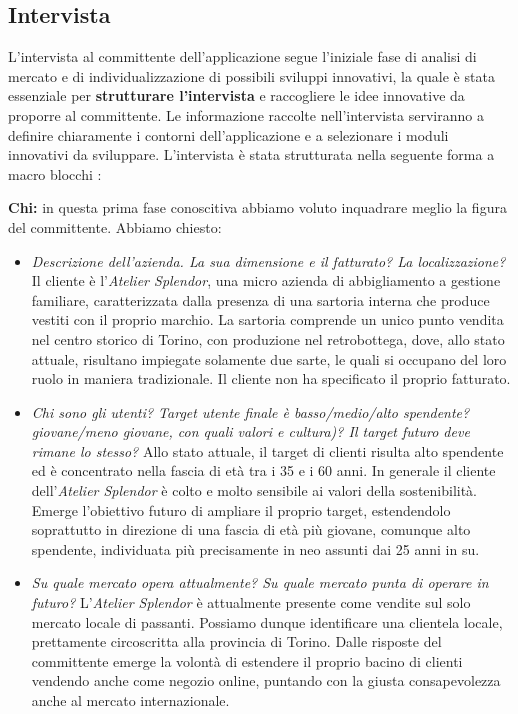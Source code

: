 \documentclass[12pt]{article}
\begin{document}
 

\subsection{Intervista}

L'intervista al committente dell'applicazione segue l'iniziale fase di analisi di mercato e di individualizzazione di possibili sviluppi innovativi, la quale è stata essenziale per \textbf{strutturare l'intervista} e raccogliere le idee innovative da proporre al committente. Le informazione raccolte nell'intervista serviranno a definire chiaramente i contorni dell'applicazione e a selezionare i moduli innovativi da sviluppare. L'intervista è stata strutturata nella seguente forma a macro blocchi \cite{up-riferimento}:

\textbf{Chi:} in questa prima fase conoscitiva abbiamo voluto inquadrare meglio la figura del committente. Abbiamo chiesto:
\begin{itemize}
    \item {\em Descrizione dell'azienda. La sua dimensione e il fatturato? La localizzazione?} Il cliente è l'{\em Atelier Splendor}, una micro azienda di abbigliamento a gestione familiare, caratterizzata dalla presenza di una sartoria interna che produce vestiti con il proprio marchio. La sartoria comprende un unico punto vendita nel centro storico di Torino, con produzione nel retrobottega, dove, allo stato attuale, risultano impiegate solamente due sarte, le quali si occupano del loro ruolo in maniera tradizionale.
    Il cliente non ha specificato il proprio fatturato.
    \item {\em Chi sono gli utenti? Target utente finale è basso/medio/alto spendente? giovane/meno giovane, con quali valori e cultura)? Il target futuro deve rimane lo stesso?} Allo stato attuale, il target di clienti risulta alto spendente ed è concentrato nella fascia di età tra i 35 e i 60 anni. In generale il cliente dell'{\em Atelier Splendor} è colto e molto sensibile ai valori della sostenibilità. Emerge l'obiettivo futuro di ampliare il proprio target, estendendolo soprattutto in direzione di una fascia di età più giovane, comunque alto spendente, individuata più precisamente in neo assunti dai 25 anni in su.  
    \item {\em Su quale mercato opera attualmente? Su quale mercato punta di operare in futuro?} L'{\em Atelier Splendor} è attualmente presente come vendite sul solo mercato locale di passanti. Possiamo dunque identificare una clientela locale, prettamente circoscritta alla provincia di Torino. Dalle risposte del committente emerge la volontà di estendere il proprio bacino di clienti vendendo anche come negozio online, puntando con la giusta consapevolezza anche al mercato internazionale.
\end{itemize}
\end{document}
